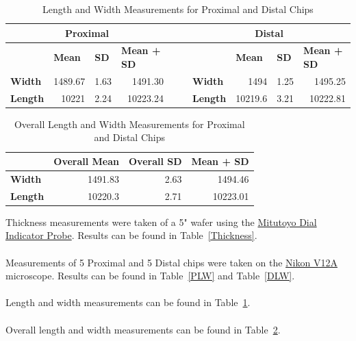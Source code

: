 \documentclass[12pt]{article}
\numberwithin{equation}{section}
\numberwithin{table}{section}
\numberwithin{figure}{section}
\begin{document}

\begin{table}[]
\centering
\caption{Length and Width Measurements for Proximal and Distal Chips}
\label{PDLW}
\begin{tabular}{@{}lrrrll|lrrr@{}}
\toprule
\multicolumn{4}{c}{\textbf{Proximal}} & \textbf{} & \textbf{} & \multicolumn{4}{c}{\textbf{Distal}} \\ \midrule
 & \multicolumn{1}{l}{\textbf{Mean}} & \multicolumn{1}{l}{\textbf{SD}} & \multicolumn{1}{l}{\textbf{Mean + SD}} & \textbf{} & \textbf{} &  & \multicolumn{1}{l}{\textbf{Mean}} & \multicolumn{1}{l}{\textbf{SD}} & \multicolumn{1}{l}{\textbf{Mean + SD}} \\
\textbf{Width} & 1489.67 & 1.63 & 1491.30 &  &  & \textbf{Width} & 1494 & 1.25 & 1495.25 \\
\textbf{Length} & 10221 & 2.24 & 10223.24 &  &  & \textbf{Length} & 10219.6 & 3.21 & 10222.81 \\ \bottomrule
\end{tabular}
\end{table}

\begin{table}[]
\centering
\caption{Overall Length and Width Measurements for Proximal and Distal Chips}
\label{OPDLW}
\begin{tabular}{@{}lrrr@{}}
\toprule
 & \multicolumn{1}{l}{\textbf{Overall Mean}} & \multicolumn{1}{l}{\textbf{Overall SD}} & \multicolumn{1}{l}{\textbf{Mean + SD}} \\ \midrule
\textbf{Width} & 1491.83 & 2.63 & 1494.46 \\
\textbf{Length} & 10220.3 & 2.71 & 10223.01 \\ \bottomrule
\end{tabular}
\end{table}


Thickness measurements were taken of a 5" wafer using the \href{https://coral.nanofab.utah.edu/lab/equipment/show_eq/Mitutoyo+Dial+Indicator+Probe}{Mitutoyo Dial Indicator Probe}. Results can be found in Table~\ref{Thickness}.
\\~\\
Measurements of 5 Proximal and 5 Distal chips were taken on the \href{https://coral.nanofab.utah.edu/lab/equipment/show_eq/Nikon+V12A}{Nikon V12A} microscope. Results can be found in Table~\ref{PLW} and Table~\ref{DLW}.
\\~\\
Length and width measurements can be found in Table~\ref{PDLW}.
\\~\\
Overall length and width measurements can be found in Table~\ref{OPDLW}.
\end{document}
